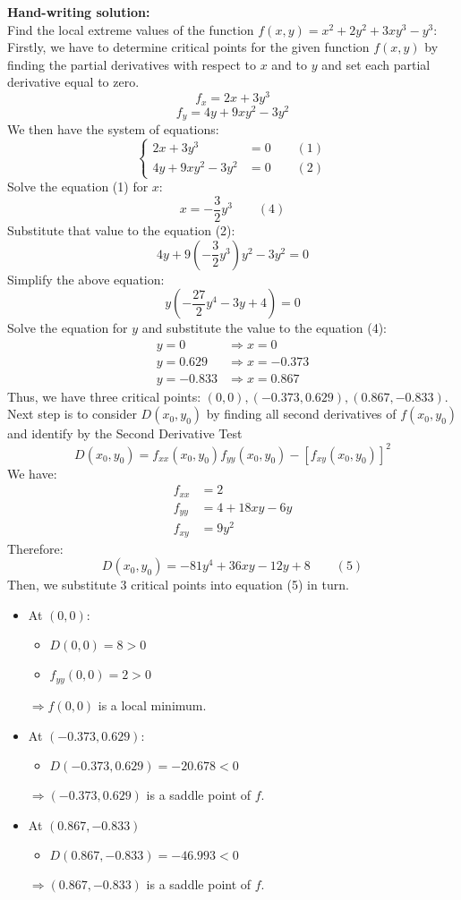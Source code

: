 \textbf {Hand-writing solution: }\\[6pt]
Find the local extreme values of the function $f(x,y) = x^2 + 2y^2 + 3xy^3 - y^3 $:\\[6pt]
Firstly, we have to determine critical points for the given function $f(x,y)$ by finding the partial derivatives with respect to $x$ and to $y$ and set each partial derivative equal to zero.
$$ f_x = 2x + 3y^3 $$
$$ f_y = 4y + 9xy^2 - 3y^2 $$
We then have the system of equations:
\[
\begin{cases}
  2x + 3y^3 &= 0 \qquad (1) \\
  4y + 9xy^2 - 3y^2 &= 0 \qquad (2)
\end{cases}
\]
Solve the equation (1) for $x$:
$$ x = -\dfrac{3}{2} y^3 \qquad (4)$$
Substitute that value to the equation (2):
$$ 4y + 9\left( -\dfrac{3}{2} y^3 \right)y^2 - 3y^2 = 0 $$
Simplify the above equation:
$$ y\left( -\dfrac{27}{2}y^4 - 3y + 4 \right) = 0 $$
Solve the equation for $y$ and substitute the value to the equation (4):
\begin{align*}
  y = 0 &\Rightarrow x = 0 \\
  y = 0.629 &\Rightarrow x = -0.373 \\
  y = -0.833 &\Rightarrow x = 0.867 
\end{align*}
Thus, we have three critical points: $(0,0), (-0.373, 0.629), (0.867, -0.833)$.\\[6pt]
Next step is to consider $D(x_0,y_0)$ by finding all second derivatives of $f(x_0,y_0)$ and identify by the Second Derivative Test 
$$ D(x_0,y_0) = f_{xx}(x_0,y_0) f_{yy}(x_0,y_0) - [f_{xy}(x_0,y_0)]^2 $$
We have:
\begin{align*}
  f_{xx} &= 2 \\
  f_{yy} &= 4 + 18xy - 6y \\
  f_{xy} &= 9y^2
\end{align*}
Therefore:
$$ D(x_0,y_0) = -81y^4+36xy-12y+8 \qquad (5)$$
Then, we substitute 3 critical points into equation (5) in turn.
\begin{itemize}
  \item At $ (0,0) $:
    \begin{itemize}
      \item $ D(0,0) = 8 > 0 $
      \item $ f_{yy}(0,0) = 2 > 0$
    \end{itemize}
    $\Rightarrow f(0,0)$ is a local minimum.
  \item At $ (-0.373, 0.629) $:
    \begin{itemize}
      \item $ D(-0.373, 0.629) = -20.678 < 0 $
    \end{itemize}
    $\Rightarrow (-0.373, 0.629)$ is a saddle point of $f$.
  \item At $ (0.867, -0.833) $  
    \begin{itemize}
      \item $ D(0.867, -0.833) = -46.993 < 0 $
    \end{itemize}
    $\Rightarrow (0.867, -0.833)$ is a saddle point of $f$.
\end{itemize}

